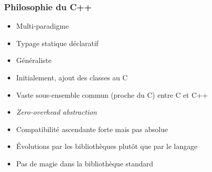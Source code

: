\documentclass[C++.tex]{subfiles}
\begin{document}
\begin{frame}[fragile]
	\frametitle{Philosophie du C++}
	\begin{itemize}
		\item Multi-paradigme


		\item Typage statique déclaratif
		\item Généraliste
		\item Initialement, ajout des classes au C


		\item Vaste sous-ensemble commun (proche du C) entre C et C++


		\item \textit{Zero-overhead abstraction}
		\item Compatibilité ascendante forte mais pas absolue
		\item Évolutions par les bibliothèques plutôt que par le langage
		\item Pas de \og magie\fg{} dans la bibliothèque standard
	\end{itemize}
\end{frame}
\end{document}
